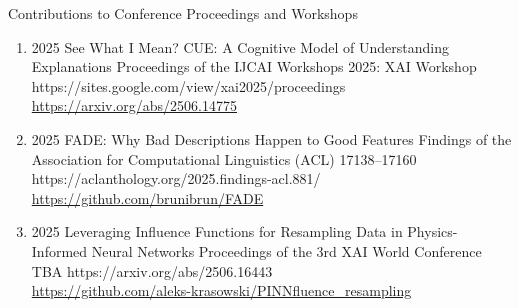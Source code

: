 \headedsubsection %
{Contributions to Conference Proceedings and Workshops}{}
{
    \begin{enumerate}
        
        
        
        
        \item {}
                        {2025}
                        {See What I Mean? CUE: A Cognitive Model of Understanding Explanations}
                        {Proceedings of the IJCAI Workshops 2025: XAI Workshop}
                        {}
                        {https://sites.google.com/view/xai2025/proceedings}
                        {\\
                        \href{https://arxiv.org/abs/2506.14775}{https://arxiv.org/abs/2506.14775}
                        }
                        
        \item {}
                        {2025}
                        {FADE: Why Bad Descriptions Happen to Good Features}
                        {Findings of the Association for Computational Linguistics (ACL)}
                        {17138--17160}
                        {https://aclanthology.org/2025.findings-acl.881/}
                        {
                            \\\href{https://github.com/brunibrun/FADE}{https://github.com/brunibrun/FADE}
                        }
                 
        \item {}
                        {2025}
                        {Leveraging Influence Functions for Resampling Data in Physics-Informed Neural Networks}
                        {Proceedings of the 3rd XAI World Conference}
                        {TBA}
                        {https://arxiv.org/abs/2506.16443}
                        {
                            \\\href{https://github.com/aleks-krasowski/PINNfluence_resampling}{https://github.com/aleks-krasowski/PINNfluence\_resampling}
                        }
        

\end{enumerate}}
